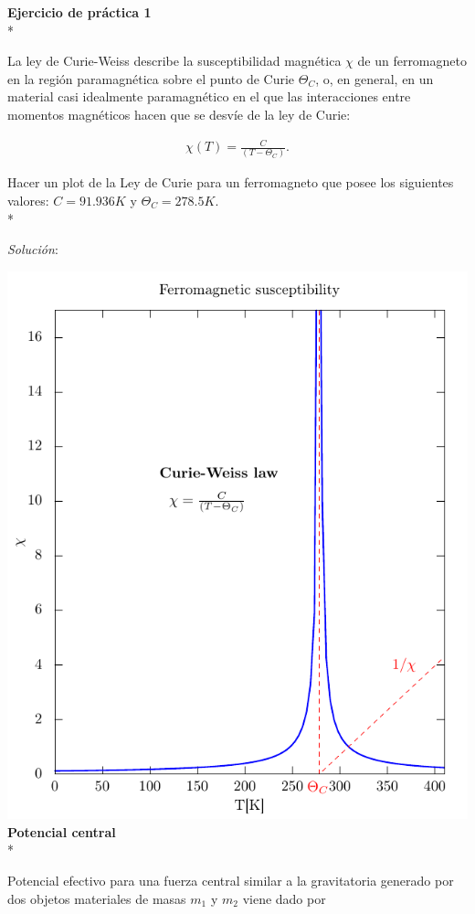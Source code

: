 \documentclass[11.5pt,a4paper]{article}
\begin{document}
\textbf{Ejercicio de práctica 1}\\*

La ley de Curie-Weiss describe la susceptibilidad magnética $\chi$ de un ferromagneto en la región paramagnética sobre el punto de Curie $\Theta_{C}$, o, en general, en un material casi idealmente paramagnético en el que las interacciones entre momentos magnéticos hacen que se desvíe de la ley de Curie: 

\begin{eqnarray*}
\chi(T) = \frac{C}{(T-\Theta_{C})}.
\end{eqnarray*}

Hacer un plot de la Ley de Curie para un ferromagneto que posee los siguientes valores: $C = 91.936 K$ y $\Theta_{C} = 278.5 K$.\\*

\textit{Solución}:

\includegraphics[scale=0.70]{ejercicio1.pdf}\\

\textbf{Potencial central}\\*

Potencial efectivo para una fuerza central similar a la gravitatoria generado por dos objetos materiales de masas $m_1$ y $m_2$ viene dado por
\end{document}
